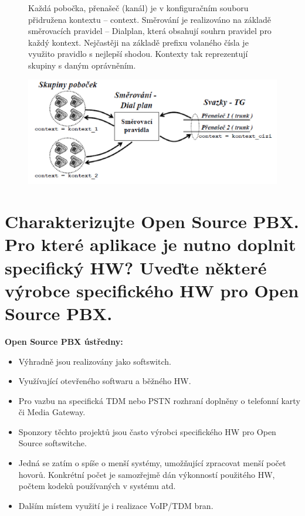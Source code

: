 \begin{figure}[H]
    \begin{center}
        \begin{minipage}[c]{0.35\textwidth}
            Každá pobočka, přenašeč (kanál) je v konfiguračním souboru přidružena kontextu -- context. Směrování je realizováno na základě směrovacích pravidel -- Dialplan, která obsahují souhrn pravidel pro každý kontext. Nejčastěji na základě prefixu volaného čísla je využito pravidlo s nejlepší shodou. Kontexty tak reprezentují skupiny s daným oprávněním.
        \end{minipage}%
        \begin{minipage}[c]{0.65\textwidth}
            \centering\includegraphics[width=12cm]{images/otazka6.png}
        \end{minipage}
\end{center}
\end{figure}

\section{Charakterizujte Open Source PBX. Pro které aplikace je nutno doplnit specifický HW? Uveďte některé výrobce specifického HW pro Open Source PBX.}

\textbf{Open Source PBX ústředny:}
\begin{itemize}[noitemsep]
    \item Výhradně jsou realizovány jako softswitch.
    \item Využívající otevřeného softwaru a běžného HW.
    \item Pro vazbu na specifická TDM nebo PSTN rozhraní doplněny o telefonní karty či Media Gateway.
    \item Sponzory těchto projektů jsou často výrobci specifického HW pro Open Source softswitche.
    \item Jedná se zatím o spíše o menší systémy, umožňující zpracovat menší počet hovorů. Konkrétní počet je samozřejmě dán výkonností použitého HW, počtem kodeků používaných v systému atd.
    \item Dalším místem využití je i realizace VoIP/TDM bran.
\end{itemize}

